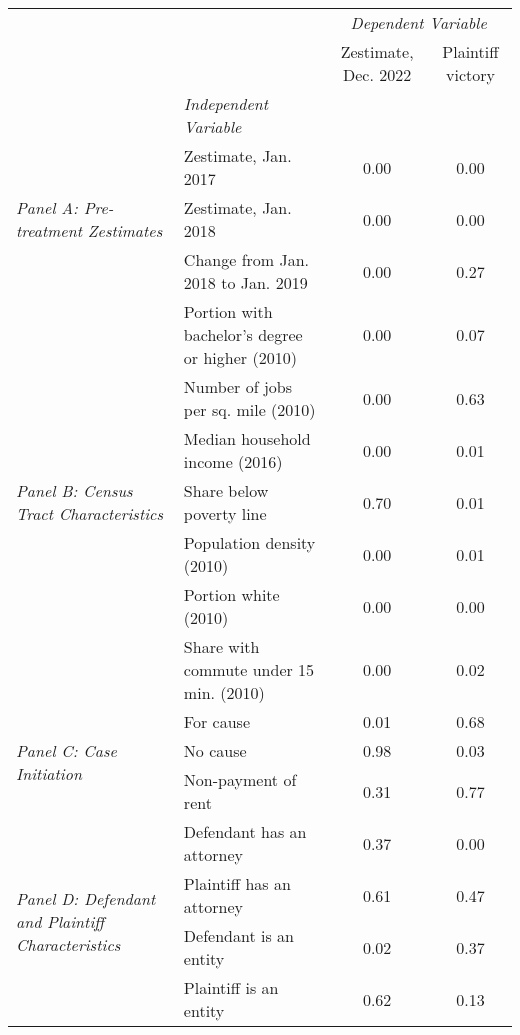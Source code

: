 \begin{tabular}{llcc}
\toprule
 &  & \multicolumn{2}{c}{\textit{Dependent Variable}} \\
 &  & Zestimate, Dec. 2022 & Plaintiff victory \\
 & \emph{Independent Variable} &  &  \\
\midrule
\multirow[c]{3}{3cm}{\textit{Panel A: Pre-treatment Zestimates}} & Zestimate, Jan. 2017 & 0.00 & 0.00 \\
 & Zestimate, Jan. 2018 & 0.00 & 0.00 \\
 & Change from Jan. 2018 to Jan. 2019 & 0.00 & 0.27 \\
\cline{1-4}
\multirow[c]{7}{3cm}{\textit{Panel B: Census Tract Characteristics}} & Portion with bachelor's degree or higher (2010) & 0.00 & 0.07 \\
 & Number of jobs per sq. mile (2010) & 0.00 & 0.63 \\
 & Median household income (2016) & 0.00 & 0.01 \\
 & Share below poverty line & 0.70 & 0.01 \\
 & Population density (2010) & 0.00 & 0.01 \\
 & Portion white (2010) & 0.00 & 0.00 \\
 & Share with commute under 15 min. (2010) & 0.00 & 0.02 \\
\cline{1-4}
\multirow[c]{3}{3cm}{\textit{Panel C: Case Initiation}} & For cause & 0.01 & 0.68 \\
 & No cause & 0.98 & 0.03 \\
 & Non-payment of rent & 0.31 & 0.77 \\
\cline{1-4}
\multirow[c]{4}{3cm}{\textit{Panel D: Defendant and Plaintiff Characteristics}} & Defendant has an attorney & 0.37 & 0.00 \\
 & Plaintiff has an attorney & 0.61 & 0.47 \\
 & Defendant is an entity & 0.02 & 0.37 \\
 & Plaintiff is an entity & 0.62 & 0.13 \\
\cline{1-4}
\bottomrule
\end{tabular}
